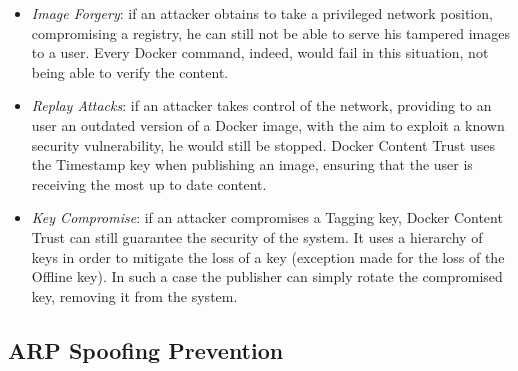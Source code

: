 \documentclass[a4paper,12pt]{article}
\begin{document}
\begin{itemize}
  \item \textit{Image Forgery}: if an attacker obtains to take a privileged
  network position, compromising a registry, he can still not be able to serve
  his tampered images to a user. Every Docker command, indeed, would fail in
  this situation, not being able to verify the content.
  \item \textit{Replay Attacks}: if an attacker takes control of the network,
  providing to an user an outdated version of a Docker image, with the aim to
  exploit a known security vulnerability, he would still be stopped. Docker
  Content Trust uses the Timestamp key when publishing an image, ensuring that
  the user is receiving the most up to date content.
  \item \textit{Key Compromise}: if an attacker compromises a Tagging key,
  Docker Content Trust can still guarantee the security of the system. It uses a
  hierarchy of keys in order to mitigate the loss of a key (exception made for
  the loss of the Offline key). In such a case the publisher can simply rotate
  the compromised key, removing it from the system. 
\end{itemize}

\subsection{ARP Spoofing Prevention}
\end{document}
